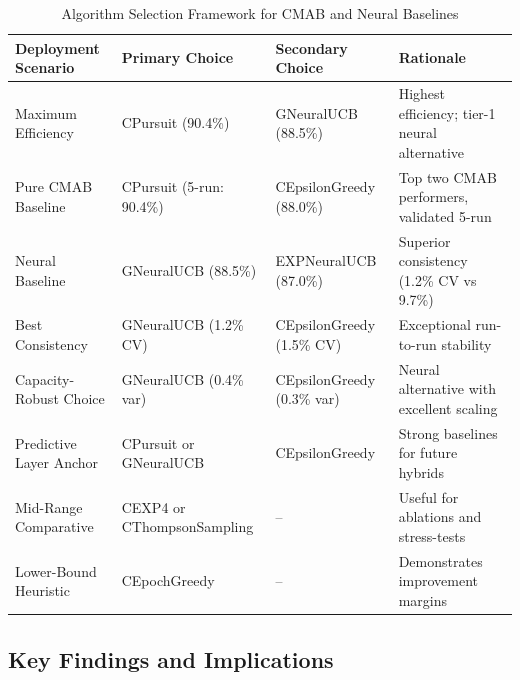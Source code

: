 \documentclass[12pt,a4paper]{article}
\begin{document}
\begin{table}[H]
\scriptsize
\centering
\caption{Algorithm Selection Framework for CMAB and Neural Baselines}
\begin{tabular}{|l|l|l|l|}
\hline
\textbf{Deployment Scenario} & \textbf{Primary Choice} & \textbf{Secondary Choice} & \textbf{Rationale} \\
\hline
\hline
Maximum Efficiency & CPursuit (90.4\%) & GNeuralUCB (88.5\%) & Highest efficiency; tier-1 neural alternative \\
Pure CMAB Baseline & CPursuit (5-run: 90.4\%) & CEpsilonGreedy (88.0\%) & Top two CMAB performers, validated 5-run \\
Neural Baseline & GNeuralUCB (88.5\%) & EXPNeuralUCB (87.0\%) & Superior consistency (1.2\% CV vs 9.7\%) \\
Best Consistency & GNeuralUCB (1.2\% CV) & CEpsilonGreedy (1.5\% CV) & Exceptional run-to-run stability \\
Capacity-Robust Choice & GNeuralUCB (0.4\% var) & CEpsilonGreedy (0.3\% var) & Neural alternative with excellent scaling \\
Predictive Layer Anchor & CPursuit or GNeuralUCB & CEpsilonGreedy & Strong baselines for future hybrids \\
Mid-Range Comparative & CEXP4 or CThompsonSampling & --           & Useful for ablations and stress-tests \\
Lower-Bound Heuristic & CEpochGreedy & --           & Demonstrates improvement margins \\
\hline
\end{tabular}
\end{table}

\subsection{Key Findings and Implications}
\end{document}

